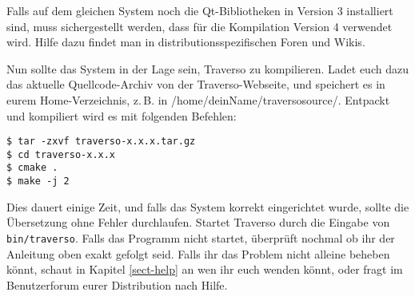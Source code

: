 Falls auf dem gleichen System noch die Qt-Bibliotheken in Version 3 installiert sind, muss sichergestellt werden, dass für die Kompilation Version 4 verwendet wird. Hilfe dazu findet man in distributionsspezifischen Foren und Wikis.

Nun sollte das System in der Lage sein, Traverso zu kompilieren. Ladet euch dazu das aktuelle Quellcode-Archiv von der Traverso-Webseite, und speichert es in eurem Home-Verzeichnis, z.\,B. in /home/deinName/traversosource/. Entpackt und kompiliert wird es mit folgenden Befehlen:

\begin{verbatim}
$ tar -zxvf traverso-x.x.x.tar.gz
$ cd traverso-x.x.x
$ cmake .
$ make -j 2
\end{verbatim}

Dies dauert einige Zeit, und falls das System korrekt eingerichtet wurde, sollte die Übersetzung ohne Fehler durchlaufen. Startet Traverso durch die Eingabe von \texttt{bin/traverso}. Falls das Programm nicht startet, überprüft nochmal ob ihr der Anleitung oben exakt gefolgt seid. Falls ihr das Problem nicht alleine beheben könnt, schaut in Kapitel \ref{sect-help} an wen ihr euch wenden könnt, oder fragt im Benutzerforum eurer Distribution nach Hilfe.
